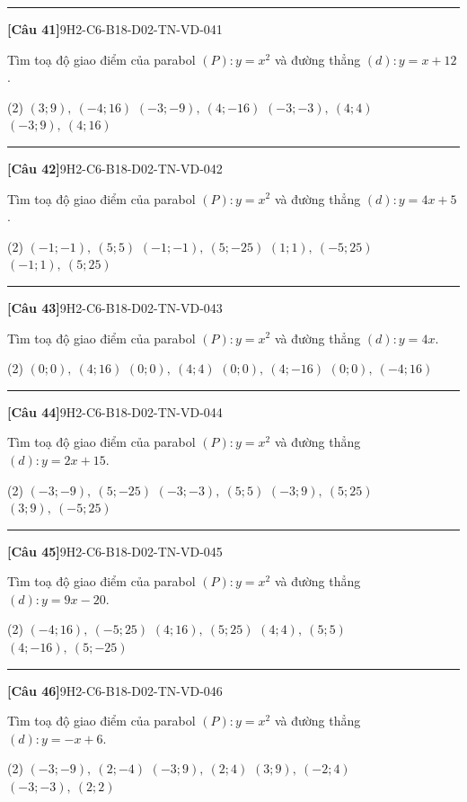 \documentclass[12pt,a4paper]{article}
\newif\ifloigiai
\newenvironment{cauhoi}[2]{%
  \par\medskip\noindent\rule{\textwidth}{0.4pt}\par\nopagebreak
  \noindent\textbf{[#1]}\hfill{\scriptsize\ttfamily #2}\par\nopagebreak\smallskip}{\par}
\newcommand{\dapan}[1]{\ifloigiai\par\smallskip\noindent\textit{Đáp án:} \textbf{#1}\par\fi}
\begin{document}
\begin{cauhoi}{Câu 41}{9H2-C6-B18-D02-TN-VD-041}
Tìm toạ độ giao điểm của parabol $(P): y=x^{2}$ và đường thẳng $(d): y=x+12$.
\begin{tasks}(2)
\task $(3;9),\ (-4;16)$
\task $(-3;-9),\ (4;-16)$
\task $(-3;-3),\ (4;4)$
\task $(-3;9),\ (4;16)$
\end{tasks}
\dapan{D}
\end{cauhoi}
\begin{cauhoi}{Câu 42}{9H2-C6-B18-D02-TN-VD-042}
Tìm toạ độ giao điểm của parabol $(P): y=x^{2}$ và đường thẳng $(d): y=4x+5$.
\begin{tasks}(2)
\task $(-1;-1),\ (5;5)$
\task $(-1;-1),\ (5;-25)$
\task $(1;1),\ (-5;25)$
\task $(-1;1),\ (5;25)$
\end{tasks}
\dapan{D}
\end{cauhoi}
\begin{cauhoi}{Câu 43}{9H2-C6-B18-D02-TN-VD-043}
Tìm toạ độ giao điểm của parabol $(P): y=x^{2}$ và đường thẳng $(d): y=4x$.
\begin{tasks}(2)
\task $(0;0),\ (4;16)$
\task $(0;0),\ (4;4)$
\task $(0;0),\ (4;-16)$
\task $(0;0),\ (-4;16)$
\end{tasks}
\dapan{A}
\end{cauhoi}
\begin{cauhoi}{Câu 44}{9H2-C6-B18-D02-TN-VD-044}
Tìm toạ độ giao điểm của parabol $(P): y=x^{2}$ và đường thẳng $(d): y=2x+15$.
\begin{tasks}(2)
\task $(-3;-9),\ (5;-25)$
\task $(-3;-3),\ (5;5)$
\task $(-3;9),\ (5;25)$
\task $(3;9),\ (-5;25)$
\end{tasks}
\dapan{C}
\end{cauhoi}
\begin{cauhoi}{Câu 45}{9H2-C6-B18-D02-TN-VD-045}
Tìm toạ độ giao điểm của parabol $(P): y=x^{2}$ và đường thẳng $(d): y=9x-20$.
\begin{tasks}(2)
\task $(-4;16),\ (-5;25)$
\task $(4;16),\ (5;25)$
\task $(4;4),\ (5;5)$
\task $(4;-16),\ (5;-25)$
\end{tasks}
\dapan{B}
\end{cauhoi}
\begin{cauhoi}{Câu 46}{9H2-C6-B18-D02-TN-VD-046}
Tìm toạ độ giao điểm của parabol $(P): y=x^{2}$ và đường thẳng $(d): y=-x+6$.
\begin{tasks}(2)
\task $(-3;-9),\ (2;-4)$
\task $(-3;9),\ (2;4)$
\task $(3;9),\ (-2;4)$
\task $(-3;-3),\ (2;2)$
\end{tasks}
\dapan{B}
\end{cauhoi}
\end{document}
